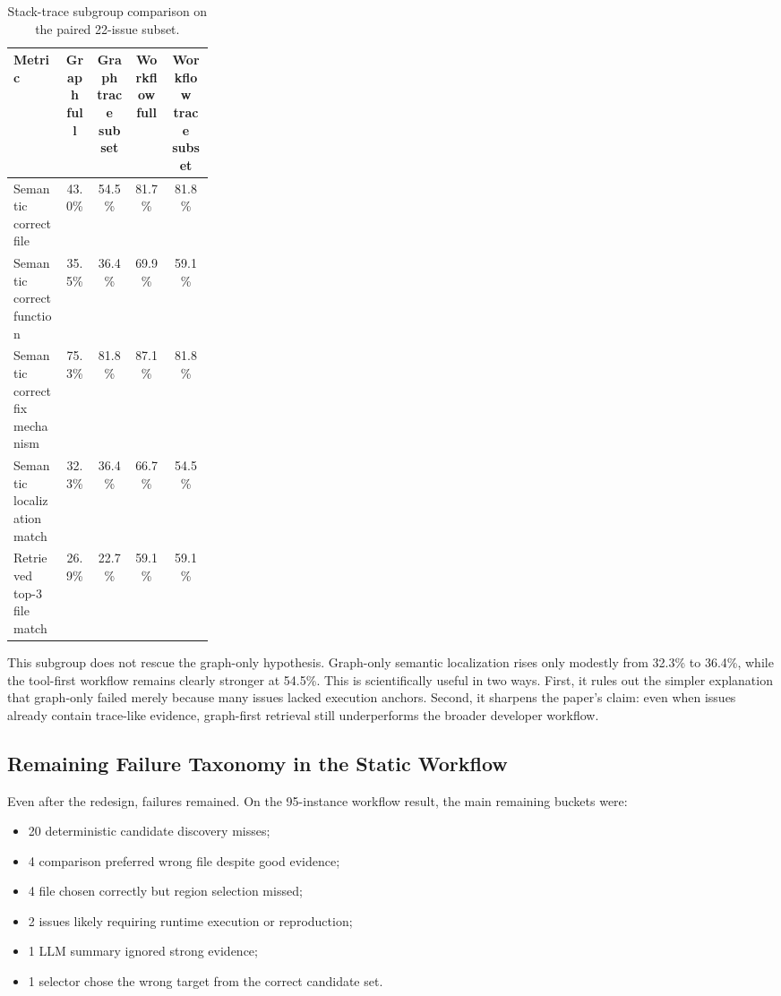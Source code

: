 \documentclass[11pt]{article}
\begin{document}
\begin{table}[t]
\centering
\small
\begin{tabular}{p{0.26\linewidth}cccc}
\toprule
Metric & Graph full & Graph trace subset & Workflow full & Workflow trace subset \\
\midrule
Semantic correct file & 43.0\% & 54.5\% & 81.7\% & 81.8\% \\
Semantic correct function & 35.5\% & 36.4\% & 69.9\% & 59.1\% \\
Semantic correct fix mechanism & 75.3\% & 81.8\% & 87.1\% & 81.8\% \\
Semantic localization match & 32.3\% & 36.4\% & 66.7\% & 54.5\% \\
Retrieved top-3 file match & 26.9\% & 22.7\% & 59.1\% & 59.1\% \\
\bottomrule
\end{tabular}
\caption{Stack-trace subgroup comparison on the paired 22-issue subset.}
\label{tab:stacktrace-subgroup}
\end{table}

This subgroup does not rescue the graph-only hypothesis. Graph-only semantic localization rises only modestly from 32.3\% to 36.4\%, while the tool-first workflow remains clearly stronger at 54.5\%. This is scientifically useful in two ways. First, it rules out the simpler explanation that graph-only failed merely because many issues lacked execution anchors. Second, it sharpens the paper’s claim: even when issues already contain trace-like evidence, graph-first retrieval still underperforms the broader developer workflow.

\subsection{Remaining Failure Taxonomy in the Static Workflow}

Even after the redesign, failures remained. On the 95-instance workflow result, the main remaining buckets were:

\begin{itemize}
\item 20 deterministic candidate discovery misses;
\item 4 comparison preferred wrong file despite good evidence;
\item 4 file chosen correctly but region selection missed;
\item 2 issues likely requiring runtime execution or reproduction;
\item 1 LLM summary ignored strong evidence;
\item 1 selector chose the wrong target from the correct candidate set.
\end{itemize}
\end{document}
